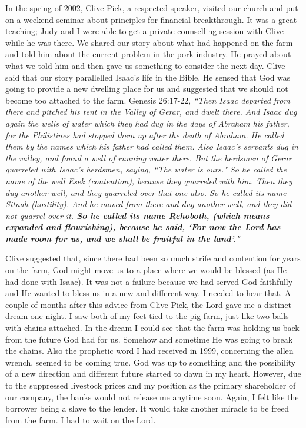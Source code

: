 \documentclass[oneside]{book}
\begin{document}
In the spring of 2002, Clive Pick, a respected speaker, visited our church and  put on a weekend seminar about principles for financial breakthrough. It was a great teaching; Judy and I were able to get a private counselling session with Clive while he was there. We shared our story about what had happened on the farm and told him about the current problem in the pork industry. He prayed about what we told him and then gave us something to consider the next day. Clive said that our story parallelled Isaac's life in the Bible. He sensed that God was going to provide a new dwelling place for us and suggested that we should not become too attached to the farm. Genesis 26:17-22, \textit{``Then Isaac departed from there and pitched his tent in the Valley of Gerar, and dwelt there. And Isaac dug again the wells of water which they had dug in the days of Abraham his father, for the Philistines had stopped them up after the death of Abraham. He called them by the names which his father had called them. Also Isaac's servants dug in the valley, and found a well of running water there. But the herdsmen of Gerar quarreled with Isaac's herdsmen, saying, ``The water is ours." So he called the name of the well Esek (contention), because they quarreled with him. Then they dug another well, and they quarreled over that one also. So he called its name Sitnah (hostility). And he moved from there and dug another well, and they did not quarrel over it. \textbf{So he called its name Rehoboth, (which means expanded and flourishing), because he said, `For now the Lord has made room for us, and we shall be fruitful in the land'."}}

Clive suggested that, since there had been so much strife and contention for years on the farm, God might move us to a place where we would be blessed (as He had done with Isaac). It was not a failure because we had served God faithfully and He wanted to bless us in a new and different way. I needed to hear that. A couple of months after this advice from Clive Pick, the Lord gave me a distinct dream one night. I saw both of my feet tied to the pig farm, just like two balls with chains attached. In the dream I could see that the farm was holding us back from the future God had for us. Somehow and sometime He was going to break the chains. Also the prophetic word I had received in 1999, concerning the allen wrench, seemed to be coming true. God was up to something and the possibility of a new direction and different future started to dawn in my heart. However, due to the suppressed livestock prices and my position as the primary shareholder of our company, the banks would not release me anytime soon. Again, I felt like the borrower being a slave to the lender. It would take another miracle to be freed from the farm. I had to wait on the Lord.
\end{document}
